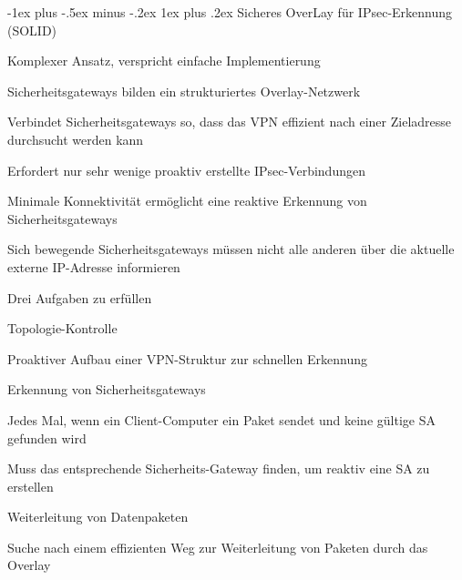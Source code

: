 \documentclass[a4paper]{article}
\makeatletter
\renewcommand{\subsubsection}{\@startsection{subsubsection}{3}{0mm}%
 {-1ex plus -.5ex minus -.2ex}%
 {1ex plus .2ex}%
 {\normalfont\small\bfseries}}
\makeatother
\begin{document}
\begin{multicols}{3}
      \subsubsection{Sicheres OverLay für IPsec-Erkennung (SOLID)}
      \begin{itemize*}
            \item Komplexer Ansatz, verspricht einfache Implementierung
            \item Sicherheitsgateways bilden ein strukturiertes Overlay-Netzwerk
            \begin{itemize*}
                  \item Verbindet Sicherheitsgateways so, dass das VPN effizient nach einer Zieladresse durchsucht werden kann
            \end{itemize*}
            \item Erfordert nur sehr wenige proaktiv erstellte IPsec-Verbindungen
            \begin{itemize*}
                  \item Minimale Konnektivität ermöglicht eine reaktive Erkennung von Sicherheitsgateways
                  \item Sich bewegende Sicherheitsgateways müssen nicht alle anderen über die aktuelle externe IP-Adresse informieren
            \end{itemize*}
            \item Drei Aufgaben zu erfüllen
            \begin{itemize*}
                  \item Topologie-Kontrolle
                  \begin{itemize*}
                        \item Proaktiver Aufbau einer VPN-Struktur zur schnellen Erkennung
                  \end{itemize*}
                  \item Erkennung von Sicherheitsgateways
                  \begin{itemize*}
                        \item Jedes Mal, wenn ein Client-Computer ein Paket sendet und keine gültige SA gefunden wird
                        \item Muss das entsprechende Sicherheits-Gateway finden, um reaktiv eine SA zu erstellen
                  \end{itemize*}
                  \item Weiterleitung von Datenpaketen
                  \begin{itemize*}
                        \item Suche nach einem effizienten Weg zur Weiterleitung von Paketen durch das Overlay
                  \end{itemize*}
            \end{itemize*}
      \end{itemize*}


\end{multicols}
\end{document}
